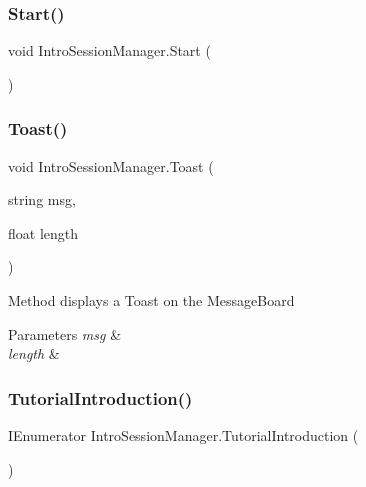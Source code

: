\subsubsection{\texorpdfstring{Start()}{Start()}}
{\footnotesize\ttfamily void Intro\+Session\+Manager.\+Start (\begin{DoxyParamCaption}{ }\end{DoxyParamCaption})\hspace{0.3cm}{\ttfamily [private]}}

\mbox{\label{class_intro_session_manager_a158dbb9e63a362ad1f71380ad1f116db}} 
\subsubsection{\texorpdfstring{Toast()}{Toast()}}
{\footnotesize\ttfamily void Intro\+Session\+Manager.\+Toast (\begin{DoxyParamCaption}\item[{string}]{msg,  }\item[{float}]{length }\end{DoxyParamCaption})}



Method displays a Toast on the Message\+Board 


\begin{DoxyParams}{Parameters}
{\em msg} & \\
\hline
{\em length} & \\
\hline
\end{DoxyParams}
\mbox{\label{class_intro_session_manager_abbbe032dd983857f6a0d843686738bfc}} 
\subsubsection{\texorpdfstring{Tutorial\+Introduction()}{TutorialIntroduction()}}
{\footnotesize\ttfamily I\+Enumerator Intro\+Session\+Manager.\+Tutorial\+Introduction (\begin{DoxyParamCaption}{ }\end{DoxyParamCaption})\hspace{0.3cm}{\ttfamily [private]}}



